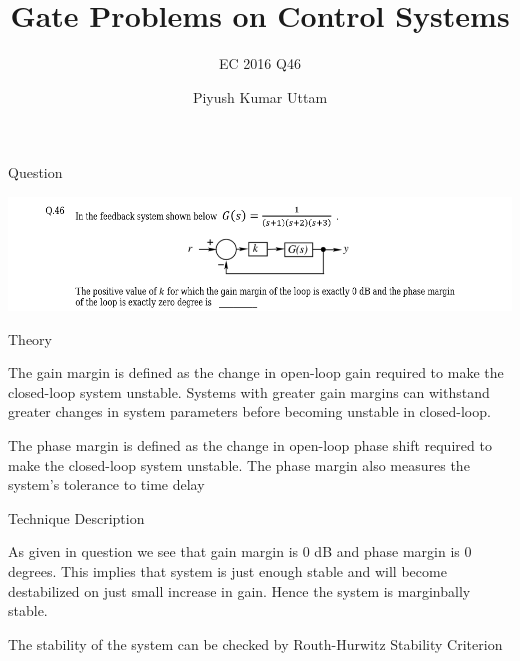 \documentclass{beamer}
\title{Gate Problems on Control Systems}
\subtitle{EC 2016 Q46}
\author{Piyush Kumar Uttam}
\institute[Indian Institute of Technology,Hyderabad] %
{
  \inst{1}%
  Department of Electrical Engineering\\
  Indian Institute of Technology,Hyderabad
 }
\date{}
\begin{document}
\begin{frame}
\titlepage
\end{frame}



\begin{frame}{Question}
\begin{block}

\includegraphics[scale=0.4]{1.png}

\end{block}
\end{frame}

\begin{frame}{Theory}

\begin{block}

The gain margin is defined as the change in open-loop gain required to make the closed-loop system unstable. Systems with greater gain margins can withstand greater changes in system parameters before becoming unstable in closed-loop. 

\end{block} \vspace{16pt}
\begin{block}

The phase margin is defined as the change in open-loop phase shift required to make the closed-loop system unstable. The phase margin also measures the system's tolerance to time delay
\end{block} \vspace{16pt}




\end{frame}



\begin{frame}{Technique Description}
\begin{block}

As given in question we see that gain margin is 0 dB and phase margin is 0 degrees. This implies that system is just enough stable and will become destabilized on just small increase in gain. Hence the system is marginbally stable.
\end{block}

\begin{block}

The stability of the system can be checked by Routh-Hurwitz Stability Criterion 
\end{block}

\end{frame}
\end{document}
